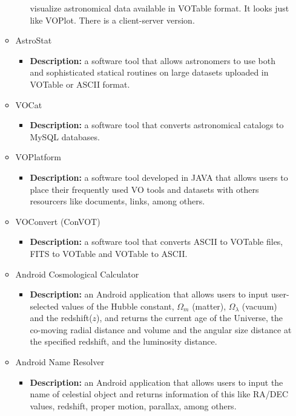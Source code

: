 \begin{itemize}
\begin{itemize}
\begin{itemize}
visualize astronomical data available in VOTable format. It looks just like
VOPlot. There is a client-server version.
\end{itemize}
\item AstroStat
\begin{itemize}
\item \textbf{Description:} a software tool that allows astronomers to use both
and sophisticated statical routines on large datasets uploaded in VOTable or
ASCII format.
\end{itemize}
\item VOCat
\begin{itemize}
\item \textbf{Description:} a software tool that converts astronomical catalogs
to MySQL databases. 
\end{itemize}
\item VOPlatform
\begin{itemize}
\item \textbf{Description:} a software tool developed in JAVA that allows users
to place their frequently used VO tools and datasets with others resourcers like
documents, links, among others.
\end{itemize}
\item VOConvert (ConVOT)
\begin{itemize}
\item \textbf{Description:} a software tool that converts ASCII to VOTable
files, FITS to VOTable and VOTable to ASCII.
\end{itemize}
\item Android Cosmological Calculator
\begin{itemize}
\item \textbf{Description:} an Android application that allows users to input
user-selected values of the Hubble constant, $ \Omega_{m} $ (matter), $
\Omega_{\lambda} $ (vacuum) and the redshift($ z $), and returns the current age
of the Universe, the co-moving radial distance and volume and the angular size
distance at the specified redshift, and the luminosity distance.
\end{itemize}
\item Android Name Resolver
\begin{itemize}
\item \textbf{Description:} an Android application that allows users to input
the name of celestial object and returns information of this like RA/DEC values,
redshift, proper motion, parallax, among others.
\end{itemize}

\end{itemize}
\end{itemize}
